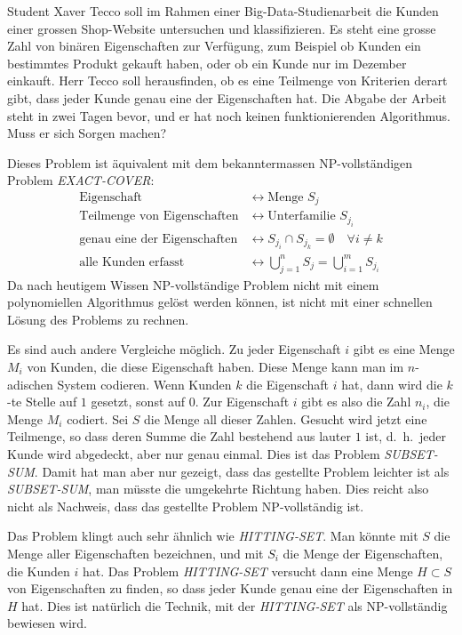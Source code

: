 Student Xaver Tecco soll im Rahmen einer Big-Data-Studienarbeit die 
Kunden einer grossen Shop-Website untersuchen und klassifizieren.
Es steht eine grosse Zahl von binären Eigenschaften zur Verfügung,
zum Beispiel ob Kunden ein bestimmtes Produkt gekauft haben, oder
ob ein Kunde nur im Dezember einkauft.
Herr Tecco soll herausfinden, ob es eine Teilmenge von Kriterien derart
gibt, dass jeder Kunde genau eine der Eigenschaften hat.
Die Abgabe der Arbeit steht in zwei Tagen bevor, und er hat noch keinen
funktionierenden Algorithmus.
Muss er sich Sorgen machen?


\begin{loesung}
Dieses Problem ist äquivalent mit dem bekanntermassen NP-vollständigen
Problem \textsl{EXACT-COVER}:
\begin{align*}
\text{Eigenschaft}&\leftrightarrow \text{Menge $S_j$}\\
\text{Teilmenge von Eigenschaften}&\leftrightarrow \text{Unterfamilie $S_{j_i}$}\\
\text{genau eine der Eigenschaften}&\leftrightarrow S_{j_i}\cap S_{j_k}=\emptyset\quad\forall i\ne k\\
\text{alle Kunden erfasst}&\leftrightarrow \bigcup_{j=1}^nS_j=\bigcup_{i=1}^m S_{j_i}
\end{align*}
Da nach heutigem Wissen NP-vollständige Problem nicht mit einem polynomiellen
Algorithmus gelöst werden können, ist nicht mit einer schnellen Lösung
des Problems zu rechnen.

Es sind auch andere Vergleiche möglich.
Zu jeder Eigenschaft $i$ gibt es eine Menge $M_i$ von Kunden, die diese
Eigenschaft haben.
Diese Menge kann man im $n$-adischen System codieren.
Wenn Kunden $k$ die Eigenschaft $i$ hat, dann wird die $k$-te Stelle
auf $1$ gesetzt, sonst auf $0$.
Zur Eigenschaft $i$ gibt es also die Zahl $n_i$, die Menge $M_i$
codiert.
Sei $S$ die Menge all dieser Zahlen.
Gesucht wird jetzt eine Teilmenge, so dass deren Summe die Zahl
bestehend aus lauter $1$ ist, d.~h.~jeder Kunde wird abgedeckt, aber
nur genau einmal.
Dies ist das Problem \textsl{SUBSET-SUM}.
Damit hat man aber nur gezeigt, dass das gestellte Problem leichter ist
als \textsl{SUBSET-SUM}, man müsste die umgekehrte Richtung haben.
Dies reicht also nicht als Nachweis, dass das gestellte Problem
NP-vollständig ist.

Das Problem klingt auch sehr ähnlich wie \textsl{HITTING-SET}.
Man könnte mit $S$ die Menge aller Eigenschaften bezeichnen,
und mit $S_i$ die Menge der Eigenschaften, die Kunden $i$ hat.
Das Problem \textsl{HITTING-SET} versucht dann eine Menge $H\subset S$
von Eigenschaften zu finden, so dass jeder Kunde genau eine der
Eigenschaften in $H$ hat.
Dies ist natürlich die Technik, mit der \textsl{HITTING-SET}
als NP-vollständig bewiesen wird.
\end{loesung}

